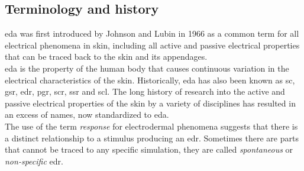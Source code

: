 \subsection{Terminology and history}
\gls{eda} was first introduced by Johnson and Lubin in 1966 \cite{johnson1996} as a common term for all electrical phenomena in skin, including all active and passive electrical properties that can be traced back to the skin and its appendages.
\\
\gls{eda} is the property of the human body that causes continuous variation in the electrical characteristics of the skin. Historically, \gls{eda} has also been known as \gls{sc}, \gls{gsr}, \gls{edr}, \gls{pgr}, \gls{scr}, \gls{ssr} and \gls{scl}. The long history of research into the active and passive electrical properties of the skin by a variety of disciplines has resulted in an excess of names, now standardized to \gls{eda}.
\\ \indent
The use of the term \textit{response} for electrodermal phenomena suggests that there is a distinct relationship to a stimulus producing an \gls{edr}. Sometimes there are parts that cannot be traced to any specific simulation, they are called \textit{spontaneous} or \textit{non-specific} \gls{edr}.

